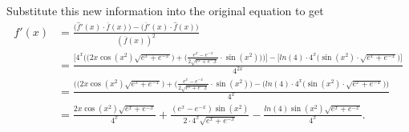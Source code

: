 \documentclass{article}
\theoremstyle{definition}
\begin{document}
Substitute this new information into the original equation to get
\begin{equation*}
\begin{split}
    f'(x) &= \frac{\big(\hat{f}'(x)\cdot \overline f(x)\big) - %
    \big(\overline f'(x)\cdot \hat{f}(x)\big)}{(\overline f(x))^2}\\
    &=\frac{\bigg[4^x\bigg(\Big(2x\cos(x^2)\sqrt{e^x+e^{-x}}\Big) + %
    \Big(\frac{e^x-e^{-x}}{2\sqrt{e^x+e^-x}}\cdot \sin(x^2)\Big)\bigg)\bigg] - %
    \bigg[ln(4)\cdot 4^x \Big(\sin(x^2)\cdot \sqrt{e^x+e^{-x}}\Big)\bigg]}{4^{2x}}\\
    &=\frac{\Big((2x\cos(x^2)\sqrt{e^x+e^{-x}}\Big) + %
    \Big(\frac{e^x-e^{-x}}{2\sqrt{e^x+e^-x}}\cdot \sin(x^2)\Big) - %
    \Big(ln(4)\cdot 4^x \big(\sin(x^2)\cdot \sqrt{e^x+e^{-x}}\big)\Big)}{4^x}\\
    &=\frac{2x\cos(x^2)\sqrt{e^x+e^{-x}}}{4^x} + %
    \frac{(e^x-e^{-x})\sin(x^2)}{2\cdot 4^x\sqrt{e^x+e^{-x}}} - %
    \frac{ln(4)\sin(x^2)\sqrt{e^x+e^{-x}}}{4^x}.
\end{split}
\end{equation*}
\end{document}
